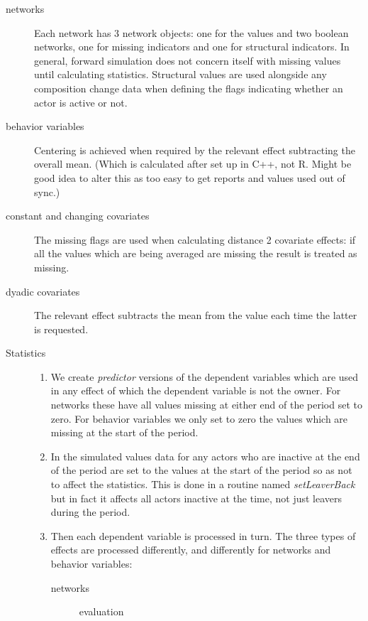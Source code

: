 \documentclass[12pt,a4paper]{article}
\renewcommand{\=}{\,=\,}
\newcommand{\+}{\,+\,}
\newcommand{\nnm}[1]{\textsf{\small\textit{#1}}}
\begin{document}
\begin{description}
\item[networks] Each network has 3 network objects: one for the values and two
  boolean networks, one for missing indicators and one for structural
  indicators. In general, forward simulation does not concern itself with
  missing values until calculating statistics. Structural values are used
  alongside any composition change data when defining the flags indicating
  whether an actor is active or not.
\item[behavior variables] Centering is achieved when required by the relevant
  effect subtracting the overall mean. (Which is calculated after set up in C++,
  not R. Might be good idea to alter this as too easy to get reports and values
  used out of sync.)
\item[constant and changing covariates] The missing
  flags are used when calculating distance 2 covariate effects: if all the
  values which are being averaged are missing the result is treated as missing.
\item[dyadic covariates] The relevant effect subtracts the mean from the value
  each time the latter is requested.
\item[Statistics]\hfill
\begin{enumerate}
\item We create \emph{predictor} versions of the dependent variables which are
  used in any effect of which the dependent variable is not the owner. For
  networks these have all values missing at either end of the period set to
  zero. For behavior variables we only set to zero the values which are missing
  at the start of the period.
\item In the simulated values data for any actors who are inactive at the end of
  the period are set to the values at the start of the period so as not to
  affect the statistics. This is done in a routine named \nnm{setLeaverBack} but
  in fact it affects all actors inactive at the time, not just leavers during
  the period.
\item Then each dependent variable is processed in turn. The three types of
  effects are processed differently, and differently for networks and behavior
  variables:
  \begin{description}
  \item[networks]\hfill
    \begin{description}
    \item[evaluation]\hfill
      \begin{enumerate}

\end{enumerate}
\end{description}
\end{description}
\end{enumerate}
\end{description}
\end{document}
